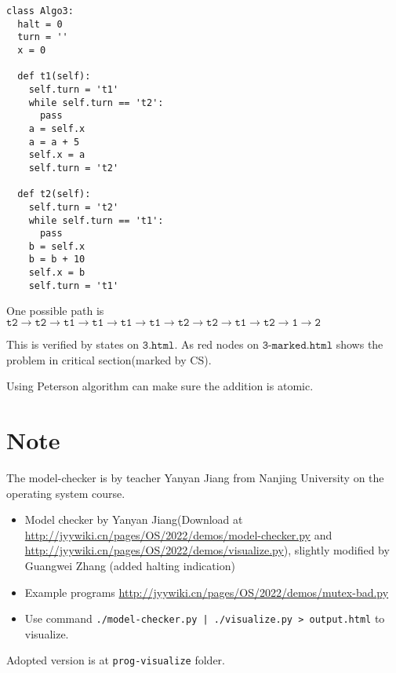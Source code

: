 \documentclass[a4paper, justified]{tufte-handout}
\newcommand{\ttt}[0]{\texttt}
\begin{document}
\begin{verbatim}
class Algo3:
  halt = 0
  turn = ''
  x = 0
 
  def t1(self):
    self.turn = 't1'
    while self.turn == 't2':
      pass
    a = self.x
    a = a + 5
    self.x = a
    self.turn = 't2'
 
  def t2(self):
    self.turn = 't2'
    while self.turn == 't1':
      pass
    b = self.x
    b = b + 10
    self.x = b
    self.turn = 't1'
\end{verbatim}

One possible path is $\ttt{t2}\rightarrow \ttt{t2}\rightarrow\ttt{t1}\rightarrow\ttt{t1}\rightarrow\ttt{t1}\rightarrow\ttt{t1}\rightarrow\ttt{t2}\rightarrow\ttt{t2}\rightarrow\ttt{t1}\rightarrow\ttt{t2}\rightarrow\ttt{1}\rightarrow\ttt{2}$

This is verified by states on $\ttt{3.html}$. As red nodes on $\ttt{3-marked.html}$ shows the problem in critical section(marked by CS).

Using Peterson algorithm can make sure the addition is atomic. 


\section{Note}

The model-checker is by teacher Yanyan Jiang from Nanjing University on the operating system course. 

\begin{itemize}
    \item Model checker by Yanyan Jiang(Download at \url{http://jyywiki.cn/pages/OS/2022/demos/model-checker.py} and \url{http://jyywiki.cn/pages/OS/2022/demos/visualize.py}), slightly modified by Guangwei Zhang (added halting indication)
    \item Example programs \url{http://jyywiki.cn/pages/OS/2022/demos/mutex-bad.py} 
    \item Use command \texttt{./model-checker.py | ./visualize.py > output.html} to visualize. 
\end{itemize}

Adopted version is at \texttt{prog-visualize} folder. 
\end{document}
